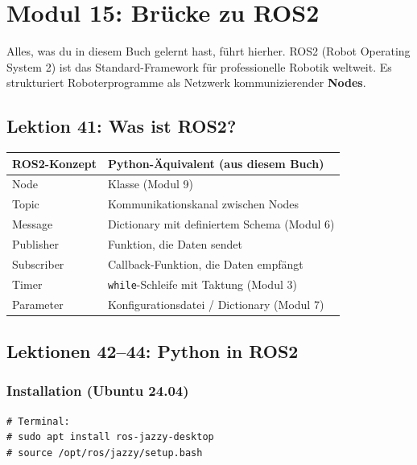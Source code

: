 \chapter{Modul 15: Brücke zu ROS2}

Alles, was du in diesem Buch gelernt hast, führt hierher. ROS2 (Robot Operating System 2) ist das Standard-Framework für professionelle Robotik weltweit. Es strukturiert Roboterprogramme als Netzwerk kommunizierender \textbf{Nodes}.

\section{Lektion 41: Was ist ROS2?}

\begin{center}
\begin{tabular}{ll}
\toprule
\textbf{ROS2-Konzept} & \textbf{Python-Äquivalent (aus diesem Buch)} \\
\midrule
Node         & Klasse (Modul 9) \\
Topic        & Kommunikationskanal zwischen Nodes \\
Message      & Dictionary mit definiertem Schema (Modul 6) \\
Publisher    & Funktion, die Daten sendet \\
Subscriber   & Callback-Funktion, die Daten empfängt \\
Timer        & \texttt{while}-Schleife mit Taktung (Modul 3) \\
Parameter    & Konfigurationsdatei / Dictionary (Modul 7) \\
\bottomrule
\end{tabular}
\end{center}

\section{Lektionen 42--44: Python in ROS2}

\subsection*{Installation (Ubuntu 24.04)}

\begin{lstlisting}
# Terminal:
# sudo apt install ros-jazzy-desktop
# source /opt/ros/jazzy/setup.bash
\end{lstlisting}

